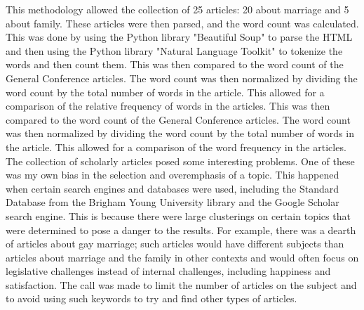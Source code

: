 \documentclass[twocolumn]{article}
\begin{document}
This methodology allowed the collection of 25 articles: 20 about marriage and 5 about family. These articles were then parsed, and the word count was calculated. This was done by using the Python library "Beautiful Soup" to parse the HTML and then using the Python library "Natural Language Toolkit" to tokenize the words and then count them. This was then compared to the word count of the General Conference articles. The word count was then normalized by dividing the word count by the total number of words in the article. This allowed for a comparison of the relative frequency of words in the articles. This was then compared to the word count of the General Conference articles. The word count was then normalized by dividing the word count by the total number of words in the article. This allowed for a comparison of the word frequency in the articles. The collection of scholarly articles posed some interesting problems. One of these was my own bias in the selection and overemphasis of a topic. This happened when certain search engines and databases were used, including the Standard Database from the Brigham Young University library and the Google Scholar search engine. This is because there were large clusterings on certain topics that were determined to pose a danger to the results. For example, there was a dearth of articles about gay marriage; such articles would have different subjects than articles about marriage and the family in other contexts and would often focus on legislative challenges instead of internal challenges, including happiness and satisfaction. The call was made to limit the number of articles on the subject and to avoid using such keywords to try and find other types of articles.
\end{document}
